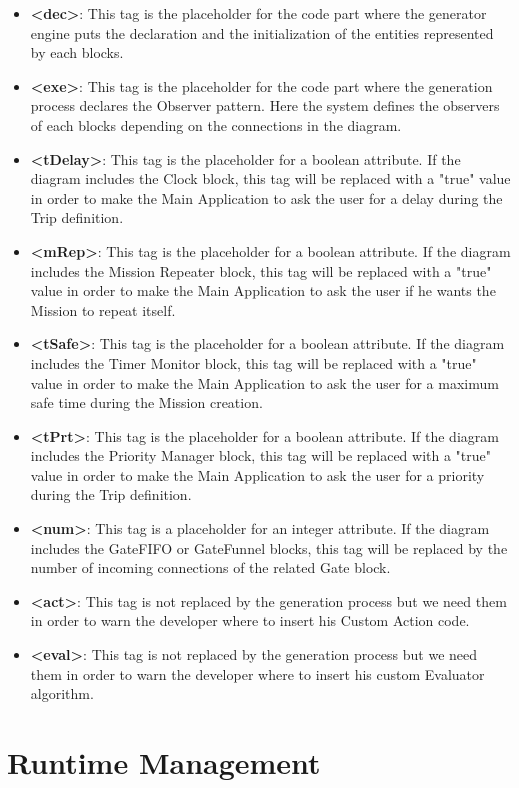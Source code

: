 \begin{itemize}
\item{\textbf{<dec>}: This tag is the placeholder for the code part where the generator engine puts the declaration and the initialization of the entities represented by each blocks.
}
\item{\textbf{<exe>}: This tag is the placeholder for the code part where the generation process declares the Observer pattern. Here the system defines the observers of each blocks depending on the connections in the diagram. 
}
\item{\textbf{<tDelay>}: This tag is the placeholder for a boolean attribute. If the diagram includes the Clock block, this tag will be replaced with a "true" value in order to make the Main Application to ask the user for a delay during the Trip definition.
}
\item{\textbf{<mRep>}: This tag is the placeholder for a boolean attribute. If the diagram includes the Mission Repeater block, this tag will be replaced with a "true" value in order to make the Main Application to ask the user if he wants the Mission to repeat itself.
}
\item{\textbf{<tSafe>}: This tag is the placeholder for a boolean attribute. If the diagram includes the Timer Monitor block, this tag will be replaced with a "true" value in order to make the Main Application to ask the user for a maximum safe time during the Mission creation.
}
\item{\textbf{<tPrt>}: This tag is the placeholder for a boolean attribute. If the diagram includes the Priority Manager block, this tag will be replaced with a "true" value in order to make the Main Application to ask the user for a priority during the Trip definition.
}
\item{\textbf{<num>}: This tag is a placeholder for an integer attribute. If the diagram includes the GateFIFO or GateFunnel blocks, this tag will be replaced by the number of incoming connections of the related Gate block.
}
\item{\textbf{<act>}: This tag is not replaced by the generation process but we need them in order to warn the developer where to insert his Custom Action code.
}
\item{\textbf{<eval>}: This tag is not replaced by the generation process but we need them in order to warn the developer where to insert his custom Evaluator algorithm. 
}
\end{itemize}

\section{Runtime Management}\label{runtimeMng}

